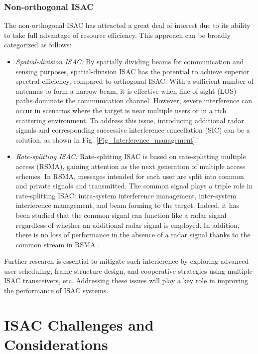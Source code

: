 \documentclass[journal, comsoc]{IEEEtran}
\begin{document}
\subsubsection{Non-orthogonal ISAC}
The non-orthogonal ISAC has attracted a great deal of interest due to its ability to take full advantage of resource efficiency. This approach can be broadly categorized as follows:
\begin{itemize}
    \item \textit{Spatial-division ISAC:}
    By spatially dividing beams for communication and sensing purposes, spatial-division ISAC has the potential to achieve superior spectral efficiency, compared to orthogonal ISAC. With a sufficient number of antennas to form a narrow beam, it is effective when line-of-sight (LOS) paths dominate the communication channel.
    However, severe interference can occur in scenarios where the target is near multiple users or in a rich scattering environment. To address this issue, introducing additional radar signals and corresponding successive interference cancellation (SIC) can be a solution, as shown in Fig. \ref{Fig_Interference_management}.
    \item \textit{Rate-splitting ISAC:} Rate-splitting ISAC is based on rate-splitting multiple access (RSMA), gaining attention as the next generation of multiple access schemes. In RSMA, messages intended for each user are split into common and private signals and transmitted. 
    The {common signal} plays a triple role in rate-splitting ISAC: intra-system interference management, inter-system interference management, and beam forming to the target. Indeed, it has been studied that the {common signal} can function like a radar signal regardless of whether an additional radar signal is employed. In addition, there is no loss of performance in the absence of a radar signal thanks to the common stream in RSMA \cite{xu2021rate}.
\end{itemize}

Further research is essential to mitigate such interference by exploring advanced user scheduling, frame structure design, and cooperative strategies using multiple ISAC transceivers, etc. Addressing these issues will play a key role in improving the performance of ISAC systems.

\section{ISAC Challenges and Considerations}
\label{sec:4}
\end{document}
